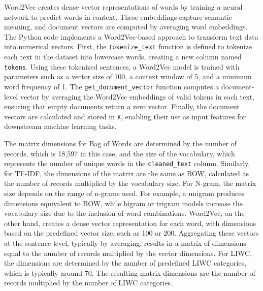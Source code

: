 \noindent
Word2Vec creates dense vector representations of words by training a neural network to predict words in context. These embeddings capture semantic meaning, and document vectors are computed by averaging word embeddings. The Python code implements a Word2Vec-based approach to transform text data into numerical vectors. First, the \texttt{tokenize\_text} function is defined to tokenize each text in the dataset into lowercase words, creating a new column named \texttt{tokens}. Using these tokenized sentences, a Word2Vec model is trained with parameters such as a vector size of 100, a context window of 5, and a minimum word frequency of 1. The \texttt{get\_document\_vector} function computes a document-level vector by averaging the Word2Vec embeddings of valid tokens in each text, ensuring that empty documents return a zero vector. Finally, the document vectors are calculated and stored in \texttt{X}, enabling their use as input features for downstream machine learning tasks.

\vspace{1em}

\noindent
The matrix dimensions for Bag of Words are determined by the number of records, which is 18,597 in this case, and the size of the vocabulary, which represents the number of unique words in the \texttt{cleaned\_text} column. Similarly, for TF-IDF, the dimensions of the matrix are the same as BOW, calculated as the number of records multiplied by the vocabulary size. For N-gram, the matrix size depends on the range of n-grams used. For example, a unigram produces dimensions equivalent to BOW, while bigram or trigram models increase the vocabulary size due to the inclusion of word combinations. Word2Vec, on the other hand, creates a dense vector representation for each word, with dimensions based on the predefined vector size, such as 100 or 200. Aggregating these vectors at the sentence level, typically by averaging, results in a matrix of dimensions equal to the number of records multiplied by the vector dimensions. For LIWC, the dimensions are determined by the number of predefined LIWC categories, which is typically around 70. The resulting matrix dimensions are the number of records multiplied by the number of LIWC categories.



